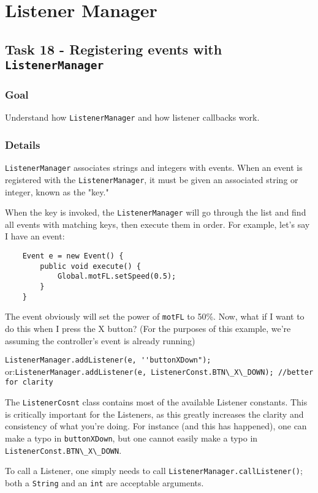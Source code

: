 \documentclass[a4paper]{article}
\begin{document}
\section{Listener Manager}\setcounter{subsection}{17}

\subsection{Task 18 - Registering events with \lstinline{ListenerManager}}
\subsubsection{Goal} Understand how \lstinline{ListenerManager} and how listener callbacks work.
\subsubsection{Details} \lstinline{ListenerManager} associates strings and integers with events. When an event is registered with the \lstinline{ListenerManager}, it must be given an associated string or integer, known as the "key." 

When the key is invoked, the \lstinline{ListenerManager} will go through the list and find all events with matching keys, then execute them in order. For example, let's say I have an event:

\begin{verbatim}
	Event e = new Event() {
		public void execute() {
			Global.motFL.setSpeed(0.5);
		}
	}
\end{verbatim}

The event obviously will set the power of \lstinline{motFL} to 50\%. Now, what if I want to do this when I press the X button? (For the purposes of this example, we're assuming the controller's event is already running)

\lstinline{ListenerManager.addListener(e, ''buttonXDown");} or:\newline\indent\lstinline{ListenerManager.addListener(e, ListenerConst.BTN\_X\_DOWN); //better for clarity}

The \lstinline{ListenerCosnt} class contains most of the available Listener constants. This is critically important for the Listeners, as this greatly increases the clarity and consistency of what you're doing. For instance (and this has happened), one can make a typo in \lstinline{buttonXDown}, but one cannot easily make a typo in \lstinline{ListenerConst.BTN\_X\_DOWN}.

To call a Listener, one simply needs to call \lstinline{ListenerManager.callListener()}; both a \lstinline{String} and an \lstinline{int} are acceptable arguments.
\end{document}
